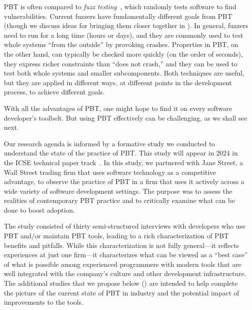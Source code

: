 PBT is often compared to {\em fuzz testing}~\cite{afl-readme},
which randomly tests software to find
vulnerabilities. Current fuzzers have fundamentally
different goals from PBT (though
we discuss ideas for bringing them closer together in
).  In general, fuzzers need to run
for a  long time (hours or
days), and they are commonly used to test whole systems ``from the
outside'' by provoking
crashes. Properties in PBT, on the other hand, can typically be
checked more quickly (on the order of seconds), they express richer
constraints than ``does not crash,'' and they can be used
to test both whole systems and smaller subcomponents.  Both techniques are useful, but
they are applied in different ways, at different points in the
development process, to achieve different goals.

With all the advantages of PBT, one might hope to find it on every
software developer's toolbelt.  But using PBT effectively
can be challenging, as we shall see next.

%
Our research agenda is informed by a formative study we conducted to
understand the state of the practice of PBT. This study will appear in 2024 in
the ICSE technical paper track~\cite{ref:goldstein2024property}.  In this
study, we partnered with Jane Street, a Wall Street trading firm that
uses software
technology as a competitive advantage, to observe the practice of PBT
in a firm that uses it actively across a wide variety of
software development settings.  The purpose was to assess the realities of
contemporary PBT practice and to critically examine what can be done to boost
adoption.

The study consisted of thirty semi-structured interviews with
developers who use PBT and/or maintain PBT tools, leading to a
rich characterization of PBT benefits and pitfalls. While this characterization
is not fully general---it reflects experiences at just one firm---it
characterizes what can be viewed as a ``best case'' of what is
possible among experienced programmers with
modern tools that are well
integrated with the company's culture and other development
infrastructure.
The additional studies that we propose below
() are intended to help complete the
picture of the current state of PBT in industry and the potential
impact of improvements to the tools.


